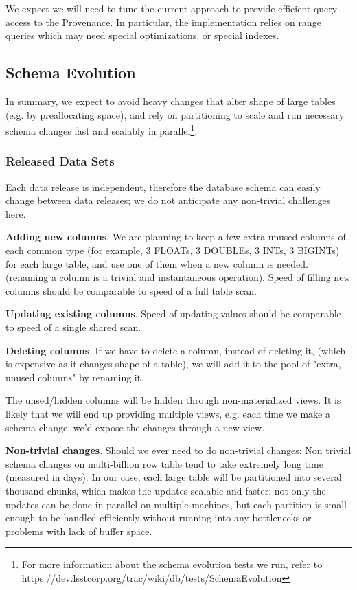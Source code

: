 \documentclass[DM,lsstdraft,toc]{lsstdoc}
\begin{document}
We expect we will need to tune the current approach to provide efficient query access to the Provenance. In particular, the implementation relies on range queries which may need special optimizations, or special indexes.

\subsection{Schema Evolution}

In summary, we expect to avoid heavy changes that alter shape of large tables (e.g. by preallocating space), and rely on partitioning to scale and run necessary schema changes fast and scalably in parallel\footnote{For more information about the schema evolution tests we run, refer to https://dev.lsstcorp.org/trac/wiki/db/tests/SchemaEvolution}.

\subsubsection{Released Data Sets}

Each data release is independent, therefore the database schema can easily change between data releases; we do not anticipate any non-trivial challenges here.

\textbf{Adding new columns}. We are planning to keep a few extra unused columns of each common type (for example, 3 FLOATs, 3 DOUBLEs, 3 INTs, 3 BIGINTs) for each large table, and use one of them when a new column is needed. (renaming a column is a trivial and instantaneous operation). Speed of filling new columns should be comparable to speed of a full table scan.

\textbf{Updating existing columns}. Speed of updating values should be comparable to speed of a single shared scan.

\textbf{Deleting columns}. If we have to delete a column, instead of deleting it, (which is expensive as it changes shape of a table), we will add it to the pool of "extra, unused columns" by renaming it.

The unsed/hidden columns will be hidden through non-materialized views. It is likely that we will end up providing multiple views, e.g. each time we make a schema change, we'd expose the changes through a new view.

\textbf{Non-trivial changes}. Should we ever need to do non-trivial changes: Non trivial schema changes on multi-billion row table tend to take extremely long time (measured in days). In our case, each large table will be partitioned into several thousand chunks, which makes the updates scalable and faster: not only the updates can be done in parallel on multiple machines, but each partition is small enough to be handled efficiently without running into any bottlenecks or problems with lack of buffer space.
\end{document}
